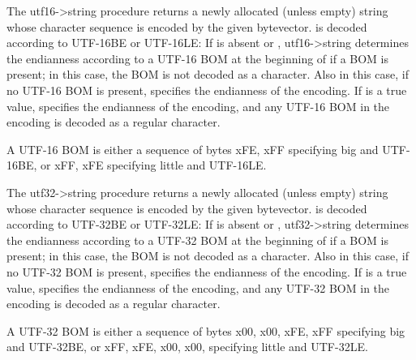 \begin{entry}{%
}

 The {\cf utf16->string} procedure returns
a newly allocated (unless empty) string whose character sequence is
encoded by the given bytevector.   is decoded
according to UTF-16BE or UTF-16LE: If  is
absent or \schfalse, {\cf utf16->string} determines the endianness
according to a UTF-16 BOM at the beginning of  if a
BOM is present; in this case, the BOM is not decoded as a character.
Also in this case, if no UTF-16 BOM is present, 
specifies the endianness of the encoding.  If
 is a true value, 
specifies the endianness of the encoding, and any UTF-16 BOM in the
encoding is decoded as a regular character.

\begin{note}
  A UTF-16 BOM is either a sequence of bytes \sharpsign{}xFE,
  \sharpsign{}xFF specifying {\cf big} and UTF-16BE, or \sharpsign{}xFF,
  \sharpsign{}xFE specifying {\cf little} and UTF-16LE.
\end{note}
\end{entry}

\begin{entry}{%
}

 The {\cf utf32->string} procedure returns
a newly allocated (unless empty) string whose character sequence is
encoded by the given bytevector.   is decoded
according to UTF-32BE or UTF-32LE: If  is
absent or \schfalse, {\cf utf32->string} determines the endianness
according to a UTF-32 BOM at the beginning of  if a
BOM is present; in this case, the BOM is not decoded as a character.
Also in this case, if no UTF-32 BOM is present, 
specifies the endianness of the encoding.  If
 is a true value, 
specifies the endianness of the encoding, and any UTF-32 BOM in the
encoding is decoded as a regular character.

\begin{note}
  A UTF-32 BOM is either a sequence of bytes \sharpsign{}x00,
  \sharpsign{}x00, \sharpsign{}xFE, \sharpsign{}xFF specifying {\cf
    big} and UTF-32BE, or \sharpsign{}xFF, \sharpsign{}xFE,
  \sharpsign{}x00, \sharpsign{}x00, specifying {\cf little} and
  UTF-32LE.
\end{note}
\end{entry}

